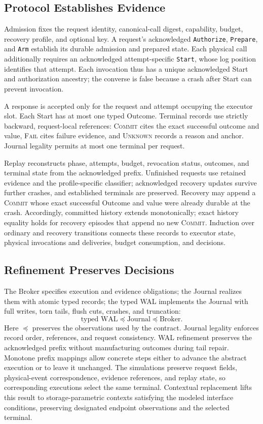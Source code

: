 \documentclass[acmsmall,screen,review,anonymous]{acmart}
\newcommand{\Unknown}{\textsc{Unknown}\xspace}
\newcommand{\Commit}{\textsc{Commit}\xspace}
\newcommand{\Fail}{\textsc{Fail}\xspace}
\begin{document}
\subsection{Protocol Establishes Evidence}

Admission fixes the request identity, canonical-call digest, capability,
budget, recovery profile, and optional key. A request's acknowledged
\texttt{Authorize}, \texttt{Prepare}, and \texttt{Arm} establish its durable
admission and prepared state. Each physical call additionally requires an
acknowledged attempt-specific \texttt{Start}, whose log position identifies
that attempt. Each invocation thus has a unique acknowledged Start and
authorization ancestry; the converse is false because a crash after
Start can prevent invocation.

A response is accepted only for the request and attempt occupying the
executor slot. Each Start has at most one typed Outcome. Terminal
records use strictly backward, request-local references: \Commit cites
the exact successful outcome and value, \Fail cites failure evidence,
and \Unknown records a reason and anchor. Journal legality permits
at most one terminal per request.

Replay reconstructs phase, attempts, budget, revocation status, outcomes,
and terminal state from the acknowledged prefix. Unfinished requests
use retained evidence and the profile-specific classifier; acknowledged
recovery updates survive further crashes, and established terminals are
preserved. Recovery may append a \Commit whose exact successful Outcome
and value were already durable at the crash. Accordingly, committed history
extends monotonically; exact history equality holds for recovery episodes
that append no new \Commit. Induction over ordinary
and recovery transitions connects these records to executor state,
physical invocations and deliveries, budget consumption, and decisions.

\subsection{Refinement Preserves Decisions}

The Broker specifies execution and evidence obligations; the Journal
realizes them with atomic typed records; the typed WAL implements the
Journal with full writes, torn tails, flush cuts, crashes, and truncation:
\[
  \text{typed WAL}\preceq\text{Journal}\preceq\text{Broker}.
\]
Here $\preceq$ preserves the observations used by the contract. Journal
legality enforces record order, references, and request consistency.
WAL refinement preserves the acknowledged prefix without manufacturing
outcomes during tail repair. Monotone prefix mappings allow concrete
steps either to advance the abstract execution or to leave it unchanged.
The simulations preserve request fields, physical-event correspondence,
evidence references, and replay state, so corresponding executions select
the same terminal. Contextual replacement lifts this result to
storage-parametric contexts satisfying the modeled interface conditions,
preserving designated endpoint observations and the selected terminal.
\end{document}
